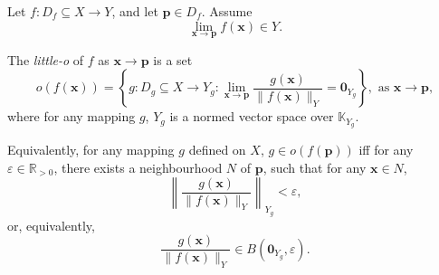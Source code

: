 \documentclass{article}
\begin{document}
\begin{definition}
	Let $f: D_f \subseteq X \to Y$, and let $\mathbf p \in D_f$. Assume
	$$
	\lim_{\mathbf x \to \mathbf p} f(\mathbf x) \in Y.
	$$
	
	The \textit{little-o} of $f$ as $\mathbf x \to \mathbf p$ is a set
	$$
	o(f(\mathbf x)) = \left\{ g: D_g \subseteq X \to Y_g : \lim_{\mathbf x \to \mathbf p} \frac{g(\mathbf x)}{\|f(\mathbf x)\|_Y} = \mathbf 0_{Y_g} \right\}, \text{ as $\mathbf x \to \mathbf p$},
	$$
	where for any mapping $g$, $Y_g$ is a normed vector space over $\mathbb K_{Y_g}$.
	
	Equivalently, for any mapping $g$ defined on $X$, $g \in o(f(\mathbf p))$ iff for any $\varepsilon \in \mathbb R_{> 0}$, there exists a neighbourhood $N$ of $\mathbf p$, such that for any $\mathbf x \in N$,
	$$
	\left\| \frac{g(\mathbf x)}{\| f(\mathbf x) \|_Y} \right\|_{Y_g} < \varepsilon,
	$$
	or, equivalently,
	$$
	\frac{g(\mathbf x)}{\| f(\mathbf x) \|_Y} \in B(\mathbf 0_{Y_g}, \varepsilon).
	$$
\end{definition}
\end{document}

